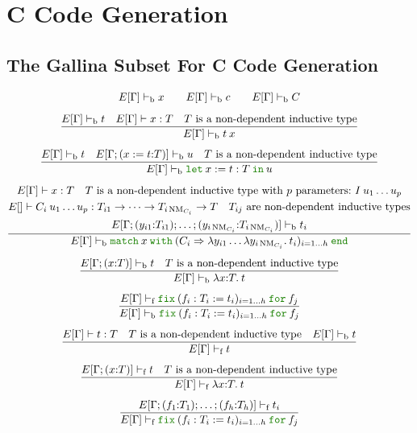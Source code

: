 \documentclass[a4paper,fleqn]{article}
\def\gallina{\textrm{Gallina}}
\newcommand{\kwlet}{\mbox{\color{mygreen}\ttfamily let}}
\newcommand{\kwin}{\mbox{\color{mygreen}\ttfamily in}}
\newcommand{\kwmatch}{\mbox{\color{mygreen}\ttfamily match}}
\newcommand{\kwwith}{\mbox{\color{mygreen}\ttfamily with}}
\newcommand{\kwend}{\mbox{\color{mygreen}\ttfamily end}}
\newcommand{\kwfix}{\mbox{\color{mygreen}\ttfamily fix}}
\newcommand{\kwfor}{\mbox{\color{mygreen}\ttfamily for}}
\newcommand{\lamT}[3]{\lambda #1\mathord{:}#2.\:#3}
\newcommand{\lamB}[1]{\lambda #1.\:}
\newcommand{\lassum}[2]{(#1\mathord{:}#2)}
\newcommand{\ldef}[3]{(#1:=#2\mathord{:}#3)}
\newcommand{\letin}[3]{\kwlet\:#1:=#2\:\kwin\:#3}
\newcommand{\match}[4]{\kwmatch\:#1\:\kwwith\:(#2 \Rightarrow #3)_{#4}\:\kwend}
\newcommand{\fix}[4]{\kwfix\:(#1 := #2)_{#3}\:\kwfor\:#4}
\DeclareMathOperator{\NM}{NM} %
\newcommand{\breakrule}{\\[0.5em]}
\newcommand{\vdashb}{\vdash_{\textrm{b}}}
\newcommand{\vdashf}{\vdash_{\textrm{f}}}
\begin{document}
\section{C Code Generation}\label{sec:c-code-gen}
\subsection{The \gallina{} Subset For C Code Generation}\label{sec:gallinasubsetforcgen}
\begin{gather*}
  E[\Gamma] \vdashb x \qquad
  E[\Gamma] \vdashb c \qquad
  E[\Gamma] \vdashb C \breakrule
  \dfrac{
    E[\Gamma] \vdashb t \quad
    E[\Gamma] \vdash x : T \quad
    \text{$T$ is a non-dependent inductive type}
  }{
    E[\Gamma] \vdashb t\:x
  } \breakrule
  \dfrac{
    E[\Gamma] \vdashb t \quad
    E[\Gamma;\ldef{x}{t}{T}] \vdashb u \quad
    \text{$T$ is a non-dependent inductive type}
  }{
    E[\Gamma] \vdashb \letin{x}{t:T}{u}
  } \breakrule
  \dfrac{
    \begin{gathered}
      E[\Gamma] \vdash x:T \quad
      \text{$T$ is a non-dependent inductive type with $p$ parameters:}~I\:u_1\ldots u_p \\
      E[] \vdash C_i\:u_1\ldots u_p: T_{i1} \rightarrow \dotsb \rightarrow T_{i\NM_{C_i}} \rightarrow T \quad
      \text{$T_{ij}$ are non-dependent inductive types} \\
      E[\Gamma;\lassum{y_{i1}}{T_{i1}};\ldots;\lassum{y_{i\NM_{C_i}}}{T_{i\NM_{C_i}}}] \vdashb t_i
    \end{gathered}
  }{
    E[\Gamma] \vdashb \match{x}{C_i}{\lambda y_{i1}\ldots\lamB{y_{i\NM_{C_i}}}t_i}{i=1\ldots h}
  } \breakrule
  \dfrac{
    E[\Gamma;\lassum{x}{T}] \vdashb t \quad
    \text{$T$ is a non-dependent inductive type}
  }{
    E[\Gamma] \vdashb \lamT{x}{T}{t}
  } \breakrule
  \dfrac{
    E[\Gamma] \vdashf \fix{f_i:T_i}{t_i}{i=1\ldots h}{f_j}
  }{
    E[\Gamma] \vdashb \fix{f_i:T_i}{t_i}{i=1\ldots h}{f_j}
  } \breakrule
  \dfrac{
    E[\Gamma] \vdash t : T \quad
    \text{$T$ is a non-dependent inductive type} \quad
    E[\Gamma] \vdashb t
  }{
    E[\Gamma] \vdashf t
  } \breakrule
  \dfrac{
    E[\Gamma;\lassum{x}{T}] \vdashf t \quad
    \text{$T$ is a non-dependent inductive type}
  }{
    E[\Gamma] \vdashf \lamT{x}{T}{t}
  } \breakrule
  \dfrac{
    E[\Gamma;\lassum{f_1}{T_1};\ldots;\lassum{f_h}{T_h}] \vdashf t_i
  }{
    E[\Gamma] \vdashf \fix{f_i:T_i}{t_i}{i=1\ldots h}{f_j}
  }
\end{gather*}
\end{document}
